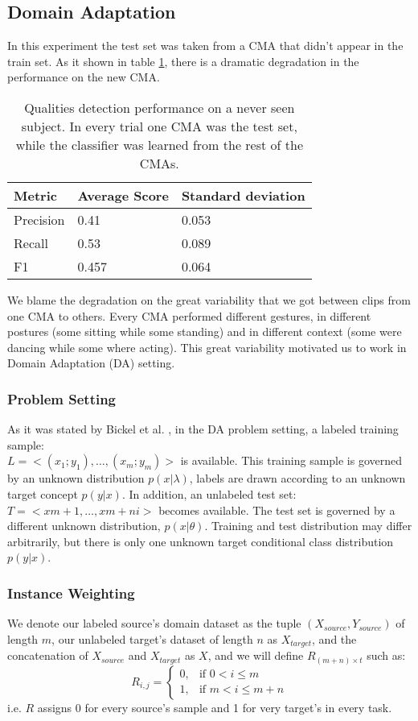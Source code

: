 \subsection{Domain Adaptation}
In this experiment the test set was taken from a CMA that didn't appear in
the train set. As it shown in table \ref{domainAdaptationBaseLine}, there is a
dramatic degradation in the performance on the new CMA.  
 \begin{table}[H]
  	\centering
	\begin{tabular}{|p{1.8cm}|p{1.8cm}|p{1.8cm}|}
	\hline
	Metric&Average Score&Standard deviation\\\hline
	Precision&0.41&0.053\\\hline
	Recall&0.53&0.089\\\hline
	F1&0.457&0.064\\\hline
	\end{tabular}
	\caption{Qualities detection performance on a never seen subject. In every
	trial one CMA was the test set, while the classifier was learned from the
rest of the CMAs.}
   \label{domainAdaptationBaseLine}
\end{table}
We blame the degradation on the great variability that we got between clips from
one CMA to others. Every CMA performed different gestures, in different postures
(some sitting while some standing) and in different context (some were dancing
while some where acting).
This great variability motivated us to work in Domain Adaptation (DA) setting.
\subsubsection{Problem Setting}
As it was stated by Bickel et al. \cite{Bickel}, in the DA problem setting, a
labeled training sample:
\\ $L = <(x_1; y_1),\ldots,(x_m; y_m)>$ is available.
This training sample is governed by an unknown distribution $p(x|\lambda)$, labels
are drawn according to an unknown target concept $p(y|x)$. In addition, an unlabeled test set: 
$T = <xm+1,\ldots,xm+ni>$ becomes available. The test set is governed by a
different unknown distribution, $p(x|\theta)$. Training and test distribution
may differ arbitrarily, but there is only one unknown
target conditional class distribution $p(y|x)$.
\subsubsection{Instance  Weighting}
We denote our labeled source's domain dataset as the tuple $(X_{source},
Y_{source})$ of length $m$, our unlabeled target's dataset of
length $n$ as $X_{target}$, and the concatenation of $X_{source}$ and
$X_{target}$ as $X$, and we will define $R_{(m+n) \times t}$ such as:
\[
    R_{i,j}=
\begin{cases}
    0,& \text{if } 0<i \leq m\\
    1,& \text{if }  m < i \leq m+n
\end{cases}
\]
i.e. $R$ assigns 0 for every source's sample and 1 for very target's in every
task.

